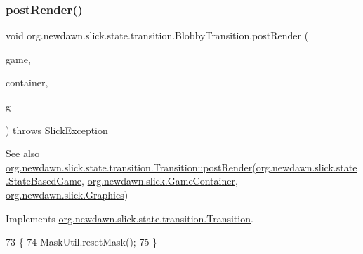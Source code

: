 \subsubsection{\texorpdfstring{post\+Render()}{postRender()}}
{\footnotesize\ttfamily void org.\+newdawn.\+slick.\+state.\+transition.\+Blobby\+Transition.\+post\+Render (\begin{DoxyParamCaption}\item[{\mbox{\hyperlink{classorg_1_1newdawn_1_1slick_1_1state_1_1_state_based_game}{State\+Based\+Game}}}]{game,  }\item[{\mbox{\hyperlink{classorg_1_1newdawn_1_1slick_1_1_game_container}{Game\+Container}}}]{container,  }\item[{\mbox{\hyperlink{classorg_1_1newdawn_1_1slick_1_1_graphics}{Graphics}}}]{g }\end{DoxyParamCaption}) throws \mbox{\hyperlink{classorg_1_1newdawn_1_1slick_1_1_slick_exception}{Slick\+Exception}}\hspace{0.3cm}{\ttfamily [inline]}}

\begin{DoxySeeAlso}{See also}
\mbox{\hyperlink{interfaceorg_1_1newdawn_1_1slick_1_1state_1_1transition_1_1_transition_ac113f4d5a19962a62a8adec7f9ab5d47}{org.\+newdawn.\+slick.\+state.\+transition.\+Transition\+::post\+Render}}(\mbox{\hyperlink{classorg_1_1newdawn_1_1slick_1_1state_1_1_state_based_game}{org.\+newdawn.\+slick.\+state.\+State\+Based\+Game}}, \mbox{\hyperlink{classorg_1_1newdawn_1_1slick_1_1_game_container}{org.\+newdawn.\+slick.\+Game\+Container}}, \mbox{\hyperlink{classorg_1_1newdawn_1_1slick_1_1_graphics}{org.\+newdawn.\+slick.\+Graphics}}) 
\end{DoxySeeAlso}


Implements \mbox{\hyperlink{interfaceorg_1_1newdawn_1_1slick_1_1state_1_1transition_1_1_transition_ac113f4d5a19962a62a8adec7f9ab5d47}{org.\+newdawn.\+slick.\+state.\+transition.\+Transition}}.


\begin{DoxyCode}
73                                                                                                            
      \{
74         MaskUtil.resetMask();
75     \}
\end{DoxyCode}
\mbox{\label{classorg_1_1newdawn_1_1slick_1_1state_1_1transition_1_1_blobby_transition_a0846a3ff8130ea47883069f622f644ec}} 
